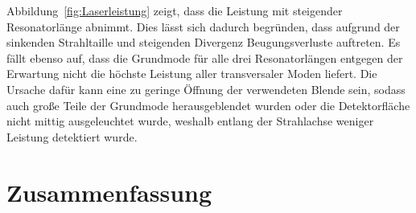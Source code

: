 \documentclass[a4paper,twoside,final]{article}
\begin{document}


Abbildung~\ref{fig:Laserleistung} zeigt, dass die Leistung mit steigender Resonatorlänge abnimmt. Dies lässt sich dadurch begründen, dass aufgrund der sinkenden Strahltaille und steigenden Divergenz Beugungsverluste auftreten. Es fällt ebenso auf, dass die Grundmode für alle drei Resonatorlängen entgegen der Erwartung nicht die höchste Leistung aller transversaler Moden liefert. Die Ursache dafür kann eine zu geringe Öffnung der verwendeten Blende sein, sodass auch große Teile der Grundmode herausgeblendet wurden oder die Detektorfläche nicht mittig ausgeleuchtet wurde, weshalb entlang der Strahlachse weniger Leistung detektiert wurde. 
\FloatBarrier
\newpage
\section{Zusammenfassung}

\appendix
\end{document}
